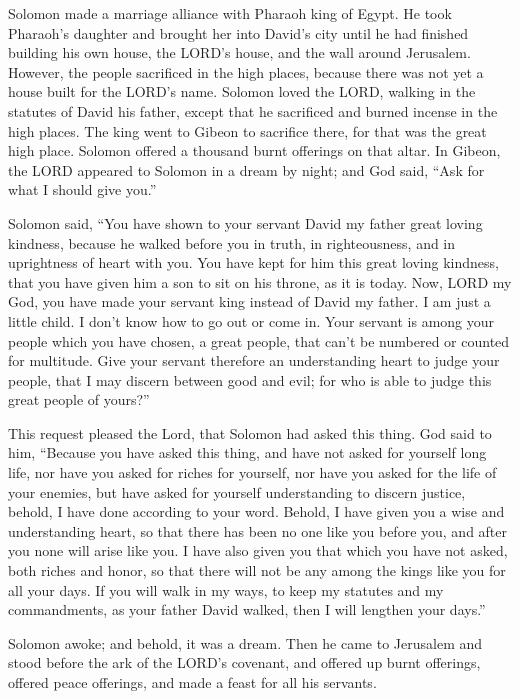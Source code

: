 \mychapter{} \myverse*{}Solomon made a marriage alliance with Pharaoh king of Egypt. He
took Pharaoh’s daughter and brought her into David’s city until he had finished building his own house,
the LORD’s house, and the wall around Jerusalem.
\myverse{}However, the people sacrificed in the high places, because there was not yet
a house built for the LORD’s name.
\myverse{}Solomon loved the LORD, walking in the statutes of David his father, except
that he sacrificed and burned incense in the high places.
\myverse{}The king went to Gibeon to sacrifice there, for that was the great high place.
Solomon offered a thousand burnt offerings on that altar.
\myverse{}In Gibeon, the LORD appeared to Solomon in a dream by night; and God said, “Ask
for what I should give you.”

\myverse{}Solomon said, “You have shown to your servant David my father great
loving kindness, because he walked before you in truth, in righteousness, and in uprightness of heart
with you. You have kept for him this great loving kindness, that you have given him a son to sit on his
throne, as it is today.
\myverse{}Now, LORD my God, you have made your servant king instead of David my father.
I am just a little child. I don’t know how to go out or come in.
\myverse{}Your servant is among your people which you have chosen, a great people, that
can’t be numbered or counted for multitude.
\myverse{}Give your servant therefore an understanding heart to judge your people, that
I may discern between good and evil; for who is able to judge this great people of yours?”

\myverse{}This request pleased the Lord, that Solomon had asked this thing.
\myverse{}God said to him, “Because you have asked this thing, and have not asked for
yourself long life, nor have you asked for riches for yourself, nor have you asked for the life of your
enemies, but have asked for yourself understanding to discern justice,
\myverse{}behold, I have done according to your word. Behold, I have given you a wise
and understanding heart, so that there has been no one like you before you, and after you none will arise
like you.
\myverse{}I have also given you that which you have not asked, both riches and honor,
so that there will not be any among the kings like you for all your days.
\myverse{}If you will walk in my ways, to keep my statutes and my commandments, as your
father David walked, then I will lengthen your days.”

\myverse{}Solomon awoke; and behold, it was a dream. Then he came to Jerusalem
and stood before the ark of the LORD’s covenant, and offered up burnt offerings, offered peace offerings,
and made a feast for all his servants.

